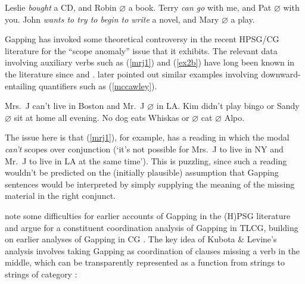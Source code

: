 \documentclass[output=paper
                ,modfonts
                ,nonflat
	        ,collection
	        ,collectionchapter
	        ,collectiontoclongg
 	        ,biblatex
                ,babelshorthands
                ,newtxmath
                ,draftmode
                ,colorlinks, citecolor=brown
]{./langsci/langscibook}
\begin{document}
\begin{exe}
 \ex\label{gapping}
  \begin{xlist}
 \ex
    Leslie \emph{bought} a CD, and Robin   \ensuremath{\varnothing}  a book.
 \ex
    Terry \emph{can go} with me, and Pat  \ensuremath{\varnothing}  with you.
 \ex
    John \emph{wants to try to begin to write} a novel, and Mary  \ensuremath{\varnothing}  a play.
  \end{xlist}
\end{exe}
Gapping has invoked some theoretical controversy in the recent
HPSG/CG literature for the ``scope anomaly'' issue that it exhibits.
The relevant data involving auxiliary verbs such as (\ref{mrj1}) and (\ref{ex2b})
have long been known in the literature since
\citet{oehrle71,oehrle1987} and 
\citet{siegel87}. \citet{mccawley1993} later pointed out similar examples
involving downward-entailing quantifiers such as (\ref{mccawley}).

\begin{exe}
 \ex\label{scope}
  \begin{xlist}
 \ex\label{mrj1}
    Mrs.\ J can't live in Boston and Mr.\ J  \ensuremath{\varnothing}  in LA.
 \ex\label{ex2b}
    Kim didn't play bingo or Sandy  \ensuremath{\varnothing}  sit at home all evening.
 \ex\label{mccawley}
    No dog eats Whiskas or  \ensuremath{\varnothing}  cat  \ensuremath{\varnothing}  Alpo.
  \end{xlist}
\end{exe}
The issue here is that (\ref{mrj1}), for example, has a reading in
which the modal \textit{can't} scopes over conjunction (`it's not
possible for Mrs.~J to live in NY and Mr.~J to live in LA at the same
time'). This is puzzling, since such a reading wouldn't be predicted
on the (initially plausible) assumption that Gapping sentences would
be interpreted by simply supplying the meaning of the missing material
in the right conjunct.

\citet{kubota-levine-nels,kubota-levine-gapping} note some
difficulties for earlier accounts of Gapping in the (H)PSG literature
\citep{sgww,abeille-ea} and argue for a constituent coordination
analysis of Gapping in TLCG, building on earlier analyses of Gapping
in CG \citep{Steedman90a-u,hendriks95,morrillsolias93}. The key idea
of Kubota \& Levine's analysis involves taking Gapping as coordination of clauses
missing a verb in the middle, which can be transparently represented
as a function from strings to strings of category {}:
\end{document}
